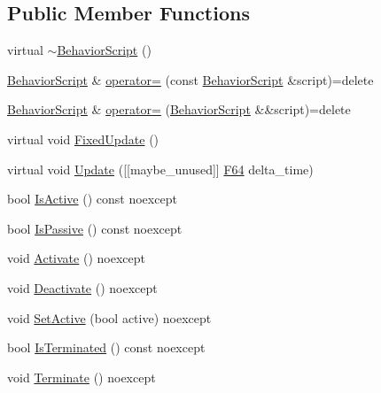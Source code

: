 \subsection*{Public Member Functions}
\begin{DoxyCompactItemize}
\item 
virtual \hyperlink{classmage_1_1_behavior_script_a61e4825ba0fc7746d49faa44ed7bc481}{$\sim$\+Behavior\+Script} ()
\item 
\hyperlink{classmage_1_1_behavior_script}{Behavior\+Script} \& \hyperlink{classmage_1_1_behavior_script_a0b3327ebf7009e668a7022d254cb1d51}{operator=} (const \hyperlink{classmage_1_1_behavior_script}{Behavior\+Script} \&script)=delete
\item 
\hyperlink{classmage_1_1_behavior_script}{Behavior\+Script} \& \hyperlink{classmage_1_1_behavior_script_a528c2bd218f2e6bb7d0a8ee50a05bf01}{operator=} (\hyperlink{classmage_1_1_behavior_script}{Behavior\+Script} \&\&script)=delete
\item 
virtual void \hyperlink{classmage_1_1_behavior_script_a8318f79ab78798ec37b39bc844f7138c}{Fixed\+Update} ()
\item 
virtual void \hyperlink{classmage_1_1_behavior_script_afb9cf3759edf8876416d1df85489cba6}{Update} (\mbox{[}\mbox{[}maybe\+\_\+unused\mbox{]}\mbox{]} \hyperlink{namespacemage_ad26233bbec640deda836e572c1a23708}{F64} delta\+\_\+time)
\item 
bool \hyperlink{classmage_1_1_behavior_script_a856e1b420ea0ead36adafa750237325c}{Is\+Active} () const noexcept
\item 
bool \hyperlink{classmage_1_1_behavior_script_a40e33539ca7013a13ef127af11bff3e1}{Is\+Passive} () const noexcept
\item 
void \hyperlink{classmage_1_1_behavior_script_a84a5bf0fc7ec3ecd36dddaf001143b54}{Activate} () noexcept
\item 
void \hyperlink{classmage_1_1_behavior_script_ab45260db9c30d596b1d688a01458f63e}{Deactivate} () noexcept
\item 
void \hyperlink{classmage_1_1_behavior_script_ab0dc76b101fd514c6e9f8799de382e8a}{Set\+Active} (bool active) noexcept
\item 
bool \hyperlink{classmage_1_1_behavior_script_abb1625dbaa3b1145009ea474b082938f}{Is\+Terminated} () const noexcept
\item 
void \hyperlink{classmage_1_1_behavior_script_a2beae460bb84a135aa7e29c7baf6b25b}{Terminate} () noexcept
\end{DoxyCompactItemize}
